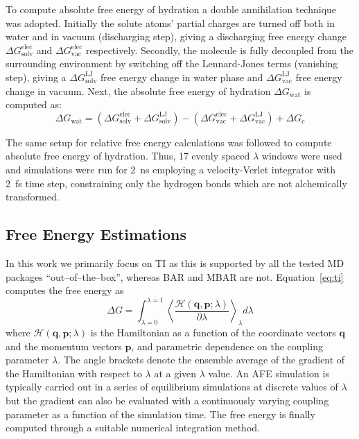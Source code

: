 \documentclass[journal=jctcce,manuscript=article]{achemso}
\renewcommand{\vec}[1]{\mathbf{#1}}
\begin{document}
To compute absolute free energy of hydration a double annihilation 
technique~\cite{jorgensen1988efficient,GILSON19971047,Bosisio2016}
was adopted. 
Initially the solute atoms' partial charges are turned off both in water and in 
vacuum (discharging step), giving a discharging
free energy change $\Delta G_\mathrm{solv}^\mathrm{elec}$ and $\Delta 
G_\mathrm{vac}^\mathrm{elec}$ respectively. Secondly,
the molecule is fully decoupled from the surrounding environment by switching 
off the Lennard-Jones terms (vanishing step), giving a $\Delta 
G_\mathrm{solv}^\mathrm{LJ}$ free energy change in water phase and $\Delta 
G_\mathrm{vac}^\mathrm{LJ}$ free energy change in vacuum. 
Next, the absolute free energy of hydration $\Delta G_\mathrm{wat}$ is computed as:
\begin{equation}
\label{eq:absolutehyd}
\Delta G_\mathrm{wat} = (\Delta G_\mathrm{solv}^\mathrm{elec} + \Delta 
G_\mathrm{solv}^\mathrm{LJ}) - (\Delta G_\mathrm{vac}^\mathrm{elec} + \Delta 
G_\mathrm{vac}^\mathrm{LJ}) + \Delta G_c
\end{equation}

The same setup for relative free energy calculations was followed to compute 
absolute free energy of hydration. Thus, 17 evenly spaced $\lambda$ windows 
were used and simulations were run for \SI{2}{ns} employing a velocity-Verlet 
integrator with \SI{2}{fs} time step, constraining only the hydrogen bonds 
which are not alchemically transformed. 


\subsection{Free Energy Estimations}
\label{sec:analysis}

In this work we primarily focus on TI as this is supported by all the tested MD
packages ``out--of--the--box'', whereas BAR and MBAR are not.
Equation~\ref{eq:ti} computes the free energy as
\begin{equation}\label{eq:ti}
	\Delta G = \int_{\lambda=0}^{\lambda=1}
	\left\langle 
	\frac{\mathscr{H}(\vec{q},\vec{p};\lambda)}{\partial\lambda}\right\rangle_\lambda
	 d\lambda
\end{equation}
where $\mathscr{H}(\vec{q},\vec{p};\lambda)$ is the Hamiltonian as a function 
of the coordinate vectors $\vec{q}$ and the momentum vectors $\vec{p}$, and 
parametric dependence on the coupling parameter $\lambda$.  The angle brackets 
denote the ensemble average of the gradient of the Hamiltonian with respect to 
$\lambda$ at a given $\lambda$ value.  An AFE simulation is typically carried 
out in a series of equilibrium simulations at discrete values of $\lambda$ but 
the gradient can also be evaluated with a continuously varying coupling 
parameter as a function of the simulation time.  The free energy is finally 
computed through a suitable numerical integration method.
\end{document}

